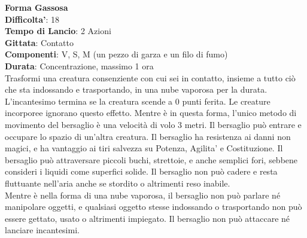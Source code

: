 \begin{multicols}{2}
\medskip\textbf{Forma Gassosa}\\
\textbf{Difficolta'}: 18\\
\textbf{Tempo di Lancio}: 2 Azioni\\
\textbf{Gittata}: Contatto\\
\textbf{Componenti}: V, S, M (un pezzo di garza e un filo di fumo)\\
\textbf{Durata}: Concentrazione, massimo 1 ora\\
Trasformi una creatura consenziente con cui sei in contatto, insieme a tutto ciò che sta indossando e trasportando, in una nube vaporosa per la durata. L’incantesimo termina se la creatura scende a 0 punti ferita. Le creature incorporee ignorano questo effetto. Mentre è in questa forma, l’unico metodo di movimento del bersaglio è una velocità di volo 3 metri. Il bersaglio può entrare e occupare lo spazio di un’altra creatura. Il bersaglio ha resistenza ai danni non magici, e ha vantaggio ai tiri salvezza su Potenza, Agilita' e Costituzione. Il bersaglio può attraversare piccoli buchi, strettoie, e anche semplici fori, sebbene consideri i liquidi come superfici solide. Il bersaglio non può cadere e resta fluttuante nell’aria anche se stordito o altrimenti reso inabile.\\
Mentre è nella forma di una nube vaporosa, il bersaglio non può parlare né manipolare oggetti, e qualsiasi oggetto stesse indossando o trasportando non può essere gettato, usato o altrimenti impiegato. Il bersaglio non può attaccare né lanciare incantesimi. 


\end{multicols}
